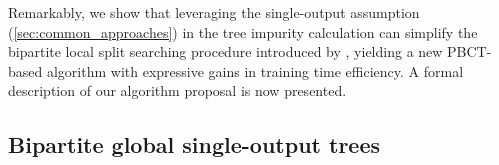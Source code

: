Remarkably, we show that leveraging the single-output assumption (\autoref{sec:common_approaches}) in the tree impurity calculation can simplify the bipartite local split searching procedure introduced by \citet{pliakos2018global}, yielding a new PBCT-based algorithm with expressive gains in training time efficiency. A formal description of our algorithm proposal is now presented.



%
%

\subsection{Bipartite global single-output trees}
\label{sec:bgso_trees}

